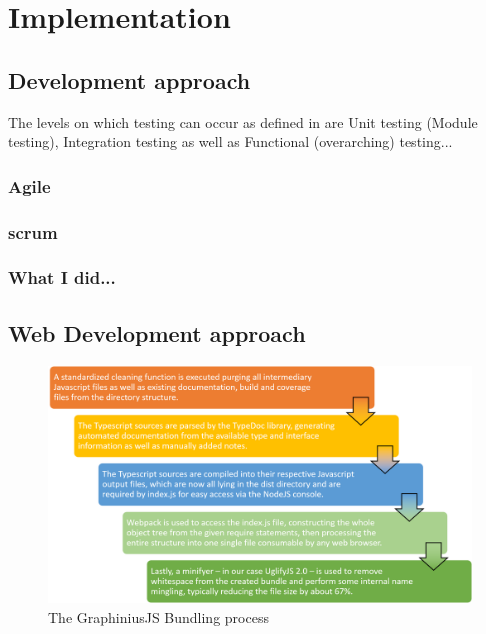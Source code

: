 \chapter{Implementation}
\label{ch:implementation}


\section{Development approach}
\label{sect:dev_approach}

The levels on which testing can occur as defined in \cite{Myers2004AST} are Unit testing (Module testing), Integration testing as well as Functional (overarching) testing...

	\subsection{Agile}
	\label{ssect:agile}
	
	\subsection{scrum}
	\label{ssect:scrum}
	
	\subsection{What I did...}
	\label{ssect:change_me}
	
	
	
\section{Web Development approach}
\label{sect:webdev_approach}


\begin{figure}[ht]
	\label{fig_js_bundling}
	\hspace*{-0.5cm}
	\includegraphics[width=1.1\textwidth]{figures/bundle_process}
	\caption{The GraphiniusJS Bundling process}
\end{figure}


